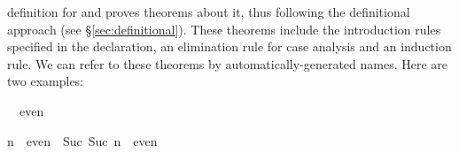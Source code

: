 \begin{isabellebody}
\begin{isamarkuptext}
definition for  and proves theorems about it,
thus following the definitional approach (see {\S}\ref{sec:definitional}).
These theorems
include the introduction rules specified in the declaration, an elimination
rule for case analysis and an induction rule.  We can refer to these
theorems by automatically-generated names.  Here are two examples:
\begin{isabelle}%
{}\ {}\ even\par\smallskip%
n\ {}\ even\ {}\ Suc\ {}Suc\ n{}\ {}\ even%
\end{isabelle}


\end{isamarkuptext}
\end{isabellebody}
